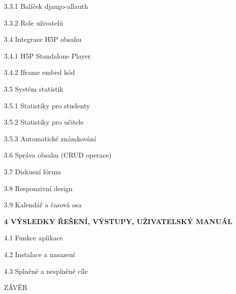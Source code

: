 \documentclass[a4paper,12pt]{article}
\begin{document}
\noindent
\hspace{1cm} 3.3.1 Balíček django-allauth 

\noindent
\hspace{1cm} 3.3.2 Role uživatelů 

\noindent
\hspace{0.5cm} 3.4 Integrace H5P obsahu 

\noindent
\hspace{1cm} 3.4.1 H5P Standalone Player 

\noindent
\hspace{1cm} 3.4.2 Iframe embed kód 

\noindent
\hspace{0.5cm} 3.5 Systém statistik 

\noindent
\hspace{1cm} 3.5.1 Statistiky pro studenty 

\noindent
\hspace{1cm} 3.5.2 Statistiky pro učitele 

\noindent
\hspace{1cm} 3.5.3 Automatické známkování 

\noindent
\hspace{0.5cm} 3.6 Správa obsahu (CRUD operace) 

\noindent
\hspace{0.5cm} 3.7 Diskusní fórum 

\noindent
\hspace{0.5cm} 3.8 Responzivní design 

\noindent
\hspace{0.5cm} 3.9 Kalendář a časová osa 

\vspace{0.5cm}

\noindent
\textbf{4 VÝSLEDKY ŘEŠENÍ, VÝSTUPY, UŽIVATELSKÝ MANUÁL} 

\noindent
\hspace{0.5cm} 4.1 Funkce aplikace 

\noindent
\hspace{0.5cm} 4.2 Instalace a nasazení 

\noindent
\hspace{0.5cm} 4.3 Splněné a nesplněné cíle 

\vspace{0.5cm}

\noindent
ZÁVĚR 
\end{document}
